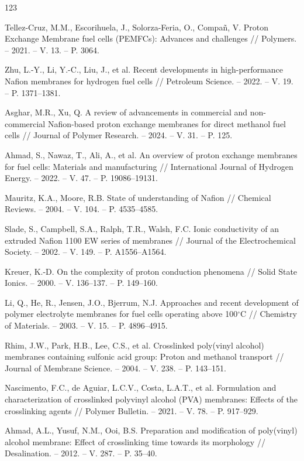 \documentclass[12pt,a4paper]{report}
\begin{document}
\begin{thebibliography}{123}

 Tellez-Cruz, M.M., Escorihuela, J., Solorza-Feria, O., Compañ, V. Proton Exchange Membrane fuel cells (PEMFCs): Advances and challenges // Polymers. – 2021. – V. 13. – P. 3064.

 Zhu, L.-Y., Li, Y.-C., Liu, J., et al. Recent developments in high-performance Nafion membranes for hydrogen fuel cells // Petroleum Science. – 2022. – V. 19. – P. 1371–1381.

 Asghar, M.R., Xu, Q. A review of advancements in commercial and non-commercial Nafion-based proton exchange membranes for direct methanol fuel cells // Journal of Polymer Research. – 2024. – V. 31. – P. 125.

 Ahmad, S., Nawaz, T., Ali, A., et al. An overview of proton exchange membranes for fuel cells: Materials and manufacturing // International Journal of Hydrogen Energy. – 2022. – V. 47. – P. 19086–19131.

 Mauritz, K.A., Moore, R.B. State of understanding of Nafion // Chemical Reviews. – 2004. – V. 104. – P. 4535–4585.

 Slade, S., Campbell, S.A., Ralph, T.R., Walsh, F.C. Ionic conductivity of an extruded Nafion 1100 EW series of membranes // Journal of the Electrochemical Society. – 2002. – V. 149. – P. A1556–A1564.

 Kreuer, K.-D. On the complexity of proton conduction phenomena // Solid State Ionics. – 2000. – V. 136–137. – P. 149–160.

 Li, Q., He, R., Jensen, J.O., Bjerrum, N.J. Approaches and recent development of polymer electrolyte membranes for fuel cells operating above 100\(^\circ\)C // Chemistry of Materials. – 2003. – V. 15. – P. 4896–4915.

 Rhim, J.W., Park, H.B., Lee, C.S., et al. Crosslinked poly(vinyl alcohol) membranes containing sulfonic acid group: Proton and methanol transport // Journal of Membrane Science. – 2004. – V. 238. – P. 143–151.

 Nascimento, F.C., de Aguiar, L.C.V., Costa, L.A.T., et al. Formulation and characterization of crosslinked polyvinyl alcohol (PVA) membranes: Effects of the crosslinking agents // Polymer Bulletin. – 2021. – V. 78. – P. 917–929.

 Ahmad, A.L., Yusuf, N.M., Ooi, B.S. Preparation and modification of poly(vinyl) alcohol membrane: Effect of crosslinking time towards its morphology // Desalination. – 2012. – V. 287. – P. 35–40.


\end{thebibliography}
\end{document}
